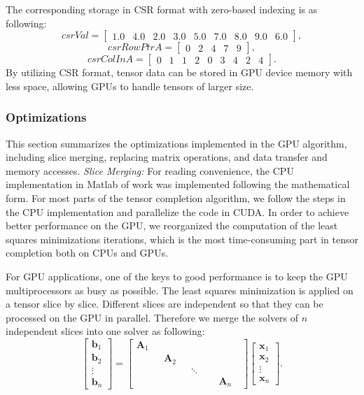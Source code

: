 \documentclass[format=acmsmall, review=false, screen=true]{acmart}
\begin{document}
The corresponding storage in CSR format with zero-based indexing is as following:
\[
csrVal = \begin{bmatrix}
    1.0 & 4.0 & 2.0 & 3.0 & 5.0 & 7.0 & 8.0 & 9.0 & 6.0
\end{bmatrix},
\]
\[
csrRowPtrA = \begin{bmatrix}
    0 & 2 & 4 & 7 & 9
\end{bmatrix},
\]
\[
csrColInA = \begin{bmatrix}
    0 & 1 & 1 & 2 & 0 & 3 & 4 & 2 & 4
\end{bmatrix}.
\]
By utilizing CSR format, tensor data can be stored in GPU device memory with less space, allowing GPUs to handle tensors of larger size.



\subsubsection{Optimizations}
This section summarizes the optimizations implemented in the GPU algorithm, including slice merging, replacing matrix operations, and data transfer and memory accesses.
\textit{Slice Merging:}
For reading convenience, the CPU implementation in Matlab of work \cite{XiaoYang2016Low} was implemented following the mathematical form. For most parts of the tensor completion algorithm, we follow the steps in the CPU implementation and parallelize the code in CUDA. In order to achieve better performance on the GPU, we reorganized the computation of the least squares minimizations iterations, which is the most time-consuming part in tensor completion both on CPUs and GPUs.

For GPU applications, one of the keys to good performance is to keep the GPU multiprocessors as busy as possible. The least squares minimization is applied on a tensor slice by slice. Different slices are independent so that they can be processed on the GPU in parallel. Therefore we merge the solvers of $n$ independent slices into one solver as following:
\[
\begin{bmatrix}
    \mathbf{b}_1 \\
    \mathbf{b}_2 \\
    \vdots \\
    \mathbf{b}_n
   \end{bmatrix}
   =
   \begin{bmatrix}
       \mathbf{A}_1 & \qquad & \qquad & \qquad \\
       \qquad & \mathbf{A}_2 & \qquad & \qquad \\
       \qquad & \qquad & \ddots & \qquad \\
       \qquad & \qquad & \qquad & \mathbf{A}_n
    \end{bmatrix}
\begin{bmatrix}
    \mathbf{x}_1 \\
    \mathbf{x}_2 \\
    \vdots \\
    \mathbf{x}_n
   \end{bmatrix}.
   \]
\end{document}
